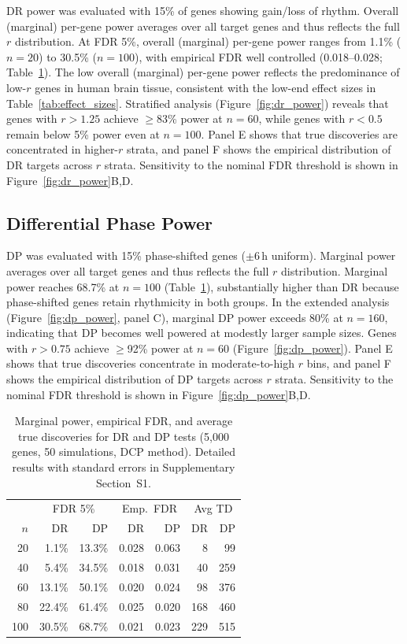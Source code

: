 \documentclass{article}
\begin{document}
DR power was evaluated with 15\% of genes showing gain/loss of rhythm. Overall (marginal) per-gene power averages over all target genes and thus reflects the full $r$ distribution. At FDR 5\%, overall (marginal) per-gene power ranges from 1.1\% ($n = 20$) to 30.5\% ($n = 100$), with empirical FDR well controlled (0.018--0.028; Table~\ref{tab:main_power}). The low overall (marginal) per-gene power reflects the predominance of low-$r$ genes in human brain tissue, consistent with the low-end effect sizes in Table~\ref{tab:effect_sizes}. Stratified analysis (Figure~\ref{fig:dr_power}) reveals that genes with $r > 1.25$ achieve $\geq$83\% power at $n = 60$, while genes with $r < 0.5$ remain below 5\% power even at $n = 100$. Panel E shows that true discoveries are concentrated in higher-$r$ strata, and panel F shows the empirical distribution of DR targets across $r$ strata. Sensitivity to the nominal FDR threshold is shown in Figure~\ref{fig:dr_power}B,D.

\subsection{Differential Phase Power}

DP was evaluated with 15\% phase-shifted genes ($\pm$6\,h uniform). Marginal power averages over all target genes and thus reflects the full $r$ distribution. Marginal power reaches 68.7\% at $n = 100$ (Table~\ref{tab:main_power}), substantially higher than DR because phase-shifted genes retain rhythmicity in both groups. In the extended analysis (Figure~\ref{fig:dp_power}, panel C), marginal DP power exceeds 80\% at $n = 160$, indicating that DP becomes well powered at modestly larger sample sizes. Genes with $r > 0.75$ achieve $\geq$92\% power at $n = 60$ (Figure~\ref{fig:dp_power}). Panel E shows that true discoveries concentrate in moderate-to-high $r$ bins, and panel F shows the empirical distribution of DP targets across $r$ strata. Sensitivity to the nominal FDR threshold is shown in Figure~\ref{fig:dp_power}B,D.

\begin{table}[H]
\centering
\small
\begin{tabular}{r|rr|rr|rr}
\toprule
& \multicolumn{2}{c|}{FDR 5\%} & \multicolumn{2}{c|}{Emp.\ FDR} & \multicolumn{2}{c}{Avg TD} \\
$n$ & DR & DP & DR & DP & DR & DP \\
\midrule
20  & 1.1\%  & 13.3\% & 0.028 & 0.063 & 8   & 99  \\
40  & 5.4\%  & 34.5\% & 0.018 & 0.031 & 40  & 259 \\
60  & 13.1\% & 50.1\% & 0.020 & 0.024 & 98  & 376 \\
80  & 22.4\% & 61.4\% & 0.025 & 0.020 & 168 & 460 \\
100 & 30.5\% & 68.7\% & 0.021 & 0.023 & 229 & 515 \\
\bottomrule
\end{tabular}
\caption{Marginal power, empirical FDR, and average true discoveries for DR and DP tests (5,000 genes, 50 simulations, DCP method). Detailed results with standard errors in Supplementary Section~S1.}
\label{tab:main_power}
\end{table}
\end{document}
